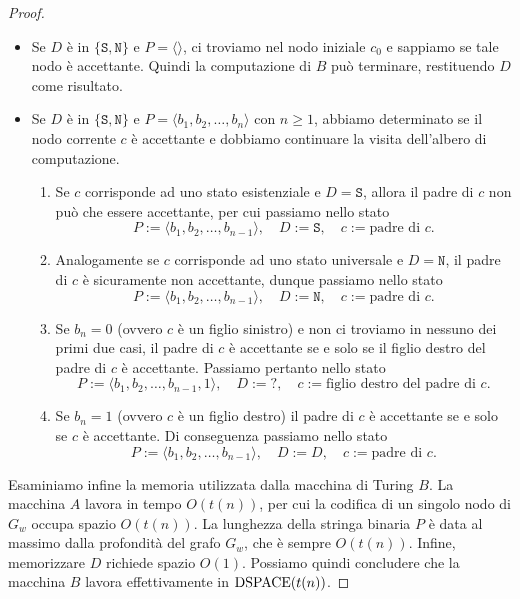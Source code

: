 \begin{proof}
\begin{itemize}
  \item Se $D$ è in $\{\texttt{S}, \texttt{N}\}$ e $P=\langle\rangle$, ci troviamo nel nodo iniziale $c_0$ e sappiamo se tale nodo è accettante. Quindi la computazione di $B$ può terminare, restituendo $D$ come risultato.
  
  \item Se $D$ è in $\{\texttt{S}, \texttt{N}\}$ e $P=\langle b_1, b_2, \ldots, b_n\rangle$ con $n\geq 1$, abbiamo determinato se il nodo corrente $c$ è accettante e dobbiamo continuare la visita dell'albero di computazione.
  \begin{enumerate}
    \item Se $c$ corrisponde ad uno stato esistenziale e $D=\texttt{S}$, allora il padre di $c$ non può che essere accettante, per cui passiamo nello stato
    \[ P := \langle b_1, b_2, \ldots, b_{n-1} \rangle, \quad D := \texttt{S}, \quad c := \text{padre di $c$}. \]
    
    \item Analogamente se $c$ corrisponde ad uno stato universale e $D=\texttt{N}$, il padre di $c$ è sicuramente non accettante, dunque passiamo nello stato
    \[ P := \langle b_1, b_2, \ldots, b_{n-1} \rangle, \quad D := \texttt{N}, \quad c := \text{padre di $c$}. \]
    
    \item Se $b_n=0$ (ovvero $c$ è un figlio sinistro) e non ci troviamo in nessuno dei primi due casi,
    il padre di $c$ è accettante se e solo se il figlio destro del padre di $c$ è accettante.
    Passiamo pertanto nello stato
    \[ P := \langle b_1, b_2, \ldots, b_{n-1}, 1 \rangle, \quad D := \texttt{?}, \quad c := \text{figlio destro del padre di $c$}. \]
    
    \item Se $b_n=1$ (ovvero $c$ è un figlio destro) il padre di $c$ è accettante se e solo se $c$ è accettante.
    Di conseguenza passiamo nello stato
    \[ P := \langle b_1, b_2, \ldots, b_{n-1} \rangle, \quad D := D, \quad c := \text{padre di $c$}. \]
  \end{enumerate}
 \end{itemize}

 Esaminiamo infine la memoria utilizzata dalla macchina di Turing $B$.
 La macchina $A$ lavora in tempo $O(t(n))$, per cui la codifica di un singolo nodo di $G_w$ occupa spazio $O(t(n))$.
 La lunghezza della stringa binaria $P$ è data al massimo dalla profondità del grafo $G_w$, che è sempre $O(t(n))$.
 Infine, memorizzare $D$ richiede spazio $O(1)$.
 Possiamo quindi concludere che la macchina $B$ lavora effettivamente in $\operatorname{DSPACE}(t(n))$.
 
\end{proof}


